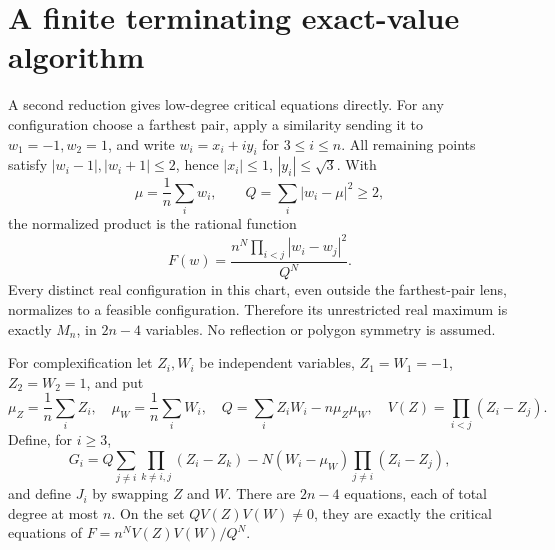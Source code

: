 \documentclass[11pt]{article}
\theoremstyle{remark}
\numberwithin{equation}{section}
\begin{document}
\section{A finite terminating exact-value algorithm}
\label{sec:exact-algorithm}
A second reduction gives low-degree critical equations directly.
For any configuration choose a farthest pair, apply a similarity
sending it to $w_1=-1,w_2=1$, and write
$w_i=x_i+iy_i$ for $3\le i\le n$.
All remaining points satisfy $|w_i-1|,|w_i+1|\le2$, hence
$|x_i|\le1$, $|y_i|\le\sqrt3$. With
\[
 \mu=\frac1n\sum_iw_i,\qquad Q=\sum_i|w_i-\mu|^2\ge2,
\]
the normalized product is the rational function
\begin{equation}\label{eq:farthest-chart}
 F(w)=\frac{n^N\prod_{i<j}|w_i-w_j|^2}{Q^N}.
\end{equation}
Every distinct real configuration in this chart, even outside the
farthest-pair lens, normalizes to a feasible configuration. Therefore
its unrestricted real maximum is exactly $M_n$, in $2n-4$ variables.
No reflection or polygon symmetry is assumed.

For complexification let $Z_i,W_i$ be independent variables,
$Z_1=W_1=-1$, $Z_2=W_2=1$, and put
\[
 \mu_Z=\frac1n\sum_iZ_i,\quad \mu_W=\frac1n\sum_iW_i,\quad
 Q=\sum_iZ_iW_i-n\mu_Z\mu_W,\quad
 V(Z)=\prod_{i<j}(Z_i-Z_j).
\]
Define, for $i\ge3$,
\begin{equation}\label{eq:critical-low-degree}
 G_i=Q\sum_{j\ne i}\prod_{k\ne i,j}(Z_i-Z_k)
       -N(W_i-\mu_W)\prod_{j\ne i}(Z_i-Z_j),
\end{equation}
and define $J_i$ by swapping $Z$ and $W$.
There are $2n-4$ equations, each of total degree at most $n$.
On the set $QV(Z)V(W)\ne0$, they are exactly the critical equations
of $F=n^NV(Z)V(W)/Q^N$.
\end{document}
